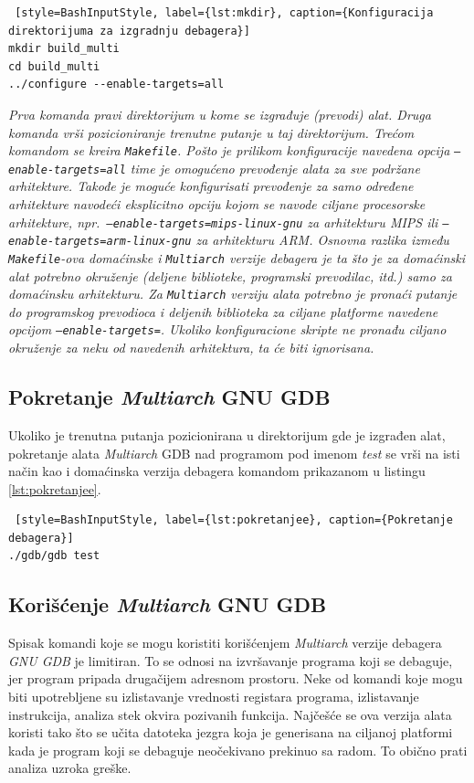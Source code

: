 \documentclass[12pt,oneside]{memoir}
\begin{document}
\begin{lstlisting} [style=BashInputStyle, label={lst:mkdir}, caption={Konfiguracija direktorijuma za izgradnju debagera}]
mkdir build_multi
cd build_multi
../configure --enable-targets=all

\end{lstlisting}
\emph{Prva komanda pravi direktorijum u kome se izgrađuje (prevodi) alat. Druga komanda vrši pozicioniranje trenutne putanje u taj direktorijum. Trećom komandom se kreira \texttt{Makefile}. Pošto je prilikom konfiguracije navedena opcija \texttt{--enable-targets=all} time je omogućeno prevođenje alata za sve podržane arhitekture. Takođe je moguće konfigurisati prevođenje za samo određene arhitekture navodeći eksplicitno opciju kojom se navode ciljane procesorske arhitekture, npr.~\texttt{–enable-targets=mips-linux-gnu} za arhitekturu \emph{MIPS} ili \texttt{–enable-targets=arm-linux-gnu} za arhitekturu \emph{ARM}. Osnovna razlika između \texttt{Makefile}-ova domaćinske i \texttt{Multiarch} verzije debagera je ta što je za domaćinski alat potrebno okruženje (deljene biblioteke, programski prevodilac, itd.) samo za domaćinsku arhitekturu. Za \texttt{Multiarch} verziju alata potrebno je pronaći putanje do programskog prevodioca i deljenih biblioteka za ciljane platforme navedene opcijom \texttt{--enable-targets=}. Ukoliko konfiguracione skripte ne pronađu ciljano okruženje za neku od navedenih arhitektura, ta će biti ignorisana.}

\subsection{Pokretanje \emph{Multiarch} GNU GDB}

Ukoliko je trenutna putanja pozicionirana u direktorijum gde je izgrađen alat, pokretanje alata \emph{Multiarch} GDB nad programom pod imenom \emph{test} se vrši na isti način kao i domaćinska verzija debagera komandom prikazanom u listingu \ref{lst:pokretanjee}.
\begin{lstlisting} [style=BashInputStyle, label={lst:pokretanjee}, caption={Pokretanje debagera}]
./gdb/gdb test

\end{lstlisting}

\subsection{Korišćenje \emph{Multiarch} GNU GDB}

Spisak komandi koje se mogu koristiti korišćenjem \emph{Multiarch} verzije debagera \emph{GNU GDB} je limitiran. To se odnosi na izvršavanje programa koji se debaguje, jer program pripada drugačijem adresnom prostoru. Neke od komandi koje mogu biti upotrebljene su izlistavanje vrednosti registara programa, izlistavanje instrukcija, analiza stek okvira pozivanih funkcija. Najčešće se ova verzija alata koristi tako što se učita datoteka jezgra koja je generisana na ciljanoj platformi kada je program koji se debaguje neočekivano prekinuo sa radom. To obično prati analiza uzroka greške.
\end{document}
